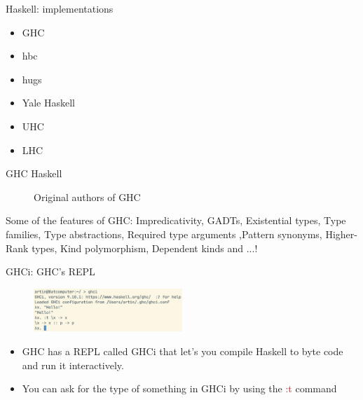\documentclass[pdf]{beamer}
\newcommand{\code}[1]{\textcolor{Red}{\textsf{#1}}}
\begin{document}
\begin{frame}{Haskell: implementations}
  \begin{itemize}
  \item GHC
  \item hbc
  \item hugs
  \item Yale Haskell
  \item UHC
  \item LHC
  \end{itemize}

\end{frame}

\begin{frame}{GHC Haskell}
  \begin{figure}[H]
    \centering
    \hspace{0.2cm}
    \caption{Original authors of GHC}
  \end{figure}

  Some of the features of GHC:
  {\small Impredicativity, GADTs, Existential types, Type families,
  Type abstractions, Required type arguments ,Pattern synonyms, Higher-Rank types, Kind polymorphism,
  Dependent kinds and ...!}
\end{frame}

\begin{frame}{GHCi: GHC's REPL}
  \begin{figure}[H]
    \centering
    \includegraphics[width=0.50\textwidth]{ghci}
  \end{figure}
  \begin{itemize}
  \item GHC has a REPL called GHCi that let's you compile Haskell to byte code and run it interactively.
  \item You can ask for the type of something in GHCi by using the \code{:t} command
  \end{itemize}
\end{frame}
\end{document}
